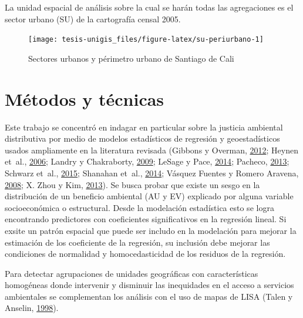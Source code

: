 \documentclass[12pt,a4paper,openany]{book}
\theoremstyle{definition}
\theoremstyle{definition}
\theoremstyle{definition}
\theoremstyle{remark}
\begin{document}
La unidad espacial de análisis sobre la cual se harán todas las
agregaciones es el sector urbano (SU) de la cartografía censal 2005.

\begin{figure}[H]

{\centering \texttt{[image: tesis-unigis\_files/figure-latex/su-periurbano-1]} 

}

\caption{Sectores urbanos y périmetro urbano de Santiago de Cali}\label{fig:su-periurbano}
\end{figure}

\section{Métodos y técnicas}\label{muxe9todos-y-tuxe9cnicas}

Este trabajo se concentró en indagar en particular sobre la justicia
ambiental distributiva por medio de modelos estadísticos de regresión y
geoestadísticos usados ampliamente en la literatura revisada (Gibbons y
Overman, \protect\hyperlink{ref-gibbons_mostly_2012}{2012}; Heynen
et~al., \protect\hyperlink{ref-heynen_political_2006}{2006}; Landry y
Chakraborty, \protect\hyperlink{ref-landry_street_2009}{2009}; LeSage y
Pace, \protect\hyperlink{ref-lesage_biggest_2014}{2014}; Pacheco,
\protect\hyperlink{ref-PACHECO2013121}{2013}; Schwarz et~al.,
\protect\hyperlink{ref-schwarz_trees_2015}{2015}; Shanahan et~al.,
\protect\hyperlink{ref-shanahan_socio-economic_2014}{2014}; Vásquez
Fuentes y Romero Aravena,
\protect\hyperlink{ref-vasquez_fuentes_vegetacion_2008}{2008}; X. Zhou y
Kim, \protect\hyperlink{ref-zhou_social_2013}{2013}). Se busca probar
que existe un sesgo en la distribución de un beneficio ambiental (AU y
EV) explicado por alguna variable socioeconómica o estructural. Desde la
modelación estadística esto se logra encontrando predictores con
coeficientes significativos en la regresión lineal. Si exsite un patrón
espacial que puede ser includo en la modelación para mejorar la
estimación de los coeficiente de la regresión, su inclusión debe mejorar
las condiciones de normalidad y homocedasticidad de los residuos de la
regresión.

Para detectar agrupaciones de unidades geográficas con características
homogéneas donde intervenir y disminuir las inequidades en el acceso a
servicios ambientales se complementan los análisis con el uso de mapas
de LISA (Talen y Anselin,
\protect\hyperlink{ref-talen_assessing_1998}{1998}).
\end{document}
